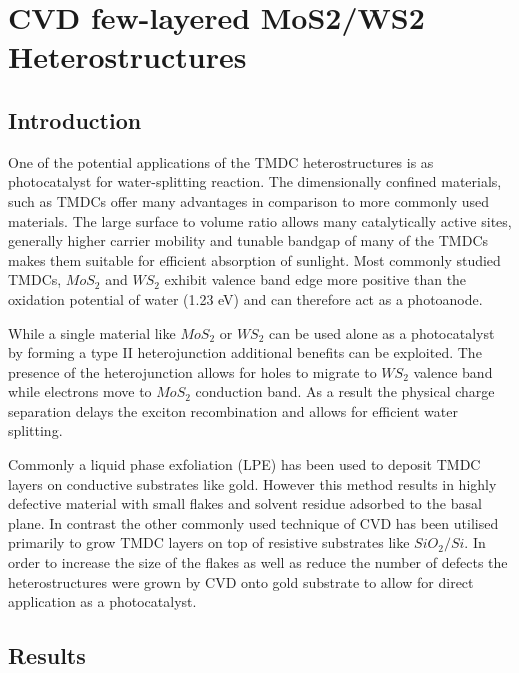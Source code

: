 \chapter{CVD few-layered MoS2/WS2 Heterostructures}
\label{cha:Heterostructures}

\section{Introduction}

One of the potential applications of the TMDC heterostructures is as photocatalyst for water-splitting reaction. The dimensionally confined materials, such as TMDCs offer many advantages in comparison to more commonly used materials. The large surface to volume ratio allows many catalytically active sites, generally higher carrier mobility and tunable bandgap of many of the TMDCs makes them suitable for efficient absorption of sunlight. Most commonly studied TMDCs, $MoS_2$ and $WS_2$ exhibit valence band edge more positive than the oxidation potential of water (1.23 eV) and can therefore act as a photoanode. 

While a single material like $MoS_2$ or $WS_2$ can be used alone as a photocatalyst by forming a type II heterojunction additional benefits can be exploited. The presence of the heterojunction allows for holes to migrate to $WS_2$ valence band while electrons move to $MoS_2$ conduction band. As a result the physical charge separation delays the exciton recombination and allows for efficient water splitting. 

Commonly a liquid phase exfoliation (LPE) has been used to deposit TMDC layers on conductive substrates like gold. However this method results in highly defective material with small flakes and solvent residue adsorbed to the basal plane. In contrast the other commonly used technique of CVD has been utilised primarily to grow TMDC layers on top of resistive substrates like $SiO_2/Si$. In order to increase the size of the flakes as well as reduce the number of defects the heterostructures were grown by CVD onto gold substrate to allow for direct application as a photocatalyst.

\section{Results}

